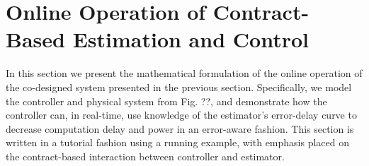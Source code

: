 \section{Online Operation of Contract-Based Estimation and Control}
\label{controlProblem}
In this section we present the mathematical formulation of the online operation of the co-designed system presented in the previous section.
Specifically, we model the controller and physical system from Fig. ??, and demonstrate how the controller can, in real-time, use knowledge of the estimator's error-delay curve to decrease computation delay and power in an error-aware fashion.
This section is written in a tutorial fashion using a running example, with emphasis placed on the contract-based interaction between controller and estimator.



